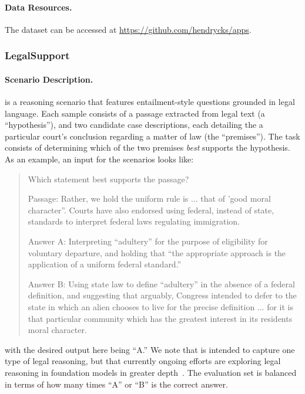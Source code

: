 \paragraph{Data Resources.}
The dataset can be accessed at \url{https://github.com/hendrycks/apps}.

\subsubsection{LegalSupport}
\label{app:scenarios-legalsupport}

\paragraph{Scenario Description.}
\legalsupport is a reasoning scenario that features entailment-style questions grounded in legal language. Each sample consists of a passage extracted from legal text (a ``hypothesis''), and two candidate case descriptions, each detailing the a particular court's conclusion regarding a matter of law (the ``premises''). The task consists of determining which of the two premises \textit{best} supports the hypothesis.
As an example, an input for the scenarios looks like: 
\begin{quote}

Which statement best supports the passage?

Passage: Rather, we hold the uniform rule is ... that of 'good moral character''. Courts have also endorsed using federal, instead of state, standards to interpret federal laws regulating immigration.

Answer A: Interpreting ``adultery'' for the purpose of eligibility for voluntary departure, and holding that ``the appropriate approach is the application of a uniform federal standard.''

Answer B: Using state law to define ``adultery'' in the absence of a federal definition, and suggesting that arguably, Congress intended to defer to the state in which an alien chooses to live for the precise definition ... for it is that particular community which has the greatest interest in its residents moral character.
\end{quote}
with the desired output here being ``A.'' We note that \legalsupport is intended to capture one type of legal reasoning, but that currently ongoing efforts are exploring legal reasoning in foundation models in greater depth~\citep{guha2022legalbench}.
The evaluation set is balanced in terms of how many times ``A'' or ``B'' is the correct answer.

